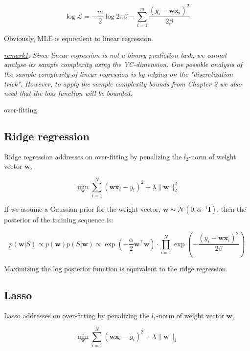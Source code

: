 \documentclass{article}
\begin{document}
	\begin{equation}
	\log \mathcal{L} = -\frac{m}{2} \log 2\pi\beta - \sum_{i=1}^m \frac{(y_i-\mathbf{wx}_i)^2}{2\beta}
	\end{equation}

	Obviously, MLE is equivalent to linear regression.

	\textit{\underline{remark1}: Since linear regression is not a binary prediction task, we cannot analyse its sample complexity using the VC-dimension. One possible analysis of the sample complexity of linear regression is by relying on the "discretization trick". However, to apply the sample complexity bounds from Chapter 2 we also need that the loss function will be bounded.}

	over-fitting

\subsection{Ridge regression}

	Ridge regression addresses on over-fitting by penalizing the $l_2$-norm of weight vector $\mathbf{w}$,
	
	\begin{equation*}
	\min_\mathbf{w} \sum_{i=1}^N (\mathbf{wx}_i - y_i)^2 + \lambda\|\mathbf{w}\|^2_2
	\end{equation*}

	If we assume a Gaussian prior for the weight vector, $\mathbf{w}\sim\mathcal{N}(0,\alpha^{-1}\mathbf{I})$, then the posterior of the training sequence is:
	
	\begin{equation}
	p(\mathbf{w}|S) \propto p(\mathbf{w}) p(S|\mathbf{w}) \propto \exp \left( -\frac{\alpha}{2} \mathbf{w}^\top \mathbf{w} \right) \cdot \prod_{i=1}^N \exp \left( -\frac{(y_i-\mathbf{wx}_i)^2}{2\beta} \right)
	\end{equation}
	
Maximizing the log posterior function is equivalent to the ridge regression.
	
\subsection{Lasso}

	Lasso addresses on over-fitting by penalizing the $l_1$-norm of weight vector $\mathbf{w}$,
		
	\begin{equation*}
	\min_\mathbf{w} \sum_{i=1}^N (\mathbf{wx}_i - y_i)^2 + \lambda\|\mathbf{w}\|_1
	\end{equation*}
	
\end{document}
